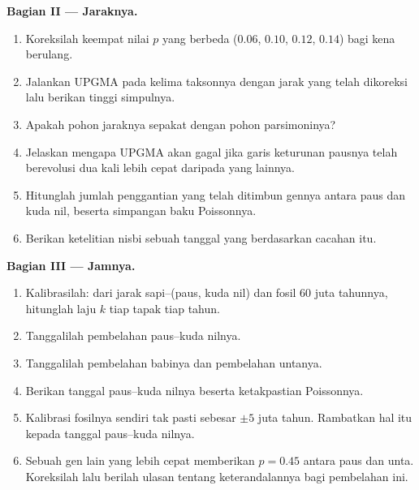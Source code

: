 \begin{problem}
\medskip
\noindent\textbf{Bagian II --- Jaraknya.}
\begin{enumerate}[resume]
  \item Koreksilah keempat nilai $p$ yang berbeda ($0.06$, $0.10$,
        $0.12$, $0.14$) bagi kena berulang.
  \item Jalankan UPGMA pada kelima taksonnya dengan jarak yang telah
        dikoreksi lalu berikan tinggi simpulnya.
  \item Apakah pohon jaraknya sepakat dengan pohon parsimoninya?
  \item Jelaskan mengapa UPGMA akan gagal jika garis keturunan pausnya
        telah berevolusi dua kali lebih cepat daripada yang lainnya.
  \item Hitunglah jumlah penggantian yang telah ditimbun gennya antara
        paus dan kuda nil, beserta simpangan baku Poissonnya.
  \item Berikan ketelitian nisbi sebuah tanggal yang berdasarkan
        cacahan itu.
\end{enumerate}

\medskip
\noindent\textbf{Bagian III --- Jamnya.}
\begin{enumerate}[resume]
  \item Kalibrasilah: dari jarak sapi--(paus, kuda nil) dan fosil 60
        juta tahunnya, hitunglah laju $k$ tiap tapak tiap tahun.
  \item Tanggalilah pembelahan paus--kuda nilnya.
  \item Tanggalilah pembelahan babinya dan pembelahan untanya.
  \item Berikan tanggal paus--kuda nilnya beserta ketakpastian
        Poissonnya.
  \item Kalibrasi fosilnya sendiri tak pasti sebesar $\pm 5$ juta
        tahun. Rambatkan hal itu kepada tanggal paus--kuda nilnya.
  \item Sebuah gen lain yang lebih cepat memberikan $p = 0.45$ antara
        paus dan unta. Koreksilah lalu berilah ulasan tentang
        keterandalannya bagi pembelahan ini.
\end{enumerate}


\end{problem}
